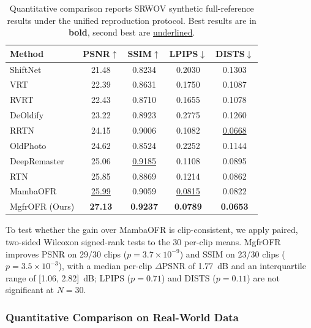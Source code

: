 \documentclass[symmetry,article,submit,pdftex,moreauthors]{Definitions/mdpi}
\begin{document}
\begin{table}[htbp]
\caption{Quantitative comparison reports SRWOV synthetic full-reference results under the unified reproduction protocol. Best results are in \textbf{bold}, second best are \underline{underlined}.\label{tab:sota}}
\begin{tabularx}{\textwidth}{lCCCC}
\toprule
\textbf{Method} & \textbf{PSNR$\uparrow$} & \textbf{SSIM$\uparrow$} & \textbf{LPIPS$\downarrow$} & \textbf{DISTS$\downarrow$} \\
\midrule
ShiftNet~\cite{li2023shiftnet}          & 21.48 & 0.8234 & 0.2030 & 0.1303 \\
VRT~\cite{liang2024vrt}                 & 22.39 & 0.8631 & 0.1750 & 0.1087 \\
RVRT~\cite{liang2022rvrt}              & 22.43 & 0.8710 & 0.1655 & 0.1078 \\
DeOldify~\cite{jantic2019deoldify}      & 23.22 & 0.8923 & 0.2775 & 0.1260 \\
RRTN~\cite{lin2024rrtn}                & 24.15 & 0.9006 & 0.1082 & \underline{0.0668} \\
OldPhoto~\cite{wan2023oldphotopami}     & 24.62 & 0.8524 & 0.2252 & 0.1144 \\
DeepRemaster~\cite{iizuka2019deepremaster} & 25.06 & \underline{0.9185} & 0.1108 & 0.0895 \\
RTN~\cite{wan2022rtn}                   & 25.85 & 0.8869 & 0.1214 & 0.0862 \\
MambaOFR~\cite{mao2025mambaofr}        & \underline{25.99} & 0.9059 & \underline{0.0815} & 0.0822 \\
\midrule
MgfrOFR (Ours)                          & \textbf{27.13} & \textbf{0.9237} & \textbf{0.0789} & \textbf{0.0653} \\
\bottomrule
\end{tabularx}
\end{table}

To test whether the gain over MambaOFR is clip-consistent, we apply paired, two-sided Wilcoxon signed-rank tests to the 30 per-clip means. MgfrOFR improves PSNR on 29/30 clips ($p=3.7\times10^{-9}$) and SSIM on 23/30 clips ($p=3.5\times10^{-3}$), with a median per-clip $\Delta$PSNR of 1.77~dB and an interquartile range of [1.06, 2.82]~dB; LPIPS ($p=0.71$) and DISTS ($p=0.11$) are not significant at $N{=}30$.

\subsubsection{Quantitative Comparison on Real-World Data}
\end{document}
